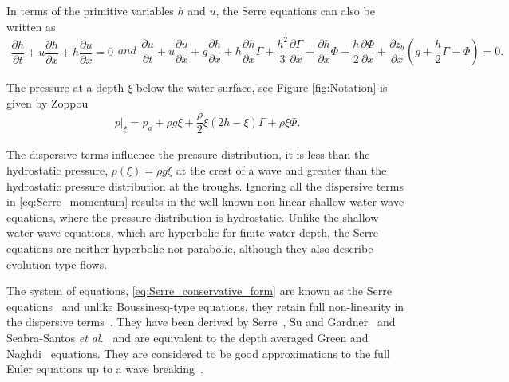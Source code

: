 \documentclass[preprint,sort&compress,1p]{article}
\begin{document}
In terms of the primitive variables $h$ and $u$, the Serre equations can also be written as
\begin{subequations}
\label{Serre_primary_variables}
\begin{gather}
\dfrac{\partial h}{\partial t} + u \dfrac{\partial h}{\partial x} + h \dfrac{\partial u}{\partial x} = 0
\end{gather}
and
\begin{gather}
\dfrac{\partial u}{\partial t} + u \dfrac{\partial u}{\partial x} + g \dfrac{\partial h}{\partial x} + h \dfrac{\partial h}{\partial x} \Gamma + \dfrac{h^2}{3} \dfrac{\partial \Gamma}{\partial x} + \dfrac{\partial h}{\partial x} \Phi + \dfrac{h}{2} \dfrac{\partial \Phi}{\partial x} + \dfrac{\partial z_b}{\partial x} \left ( g + \dfrac{h}{2} \Gamma + \Phi \right ) = 0 .
\label{Serre_primary_variables_momentum}
\end{gather}
\end{subequations}

The pressure at a depth $\xi$ below the water surface, see Figure \ref{fig:Notation} is given by Zoppou \cite{Zoppou-C-2014}
\begin{gather}\label{eq:pressure_serre}
p|_\xi = p_a + \rho g \xi + \dfrac{\rho}{2} \xi ( 2h - \xi ) \Gamma + \rho \xi \Phi.
\end{gather}

The dispersive terms influence the pressure distribution, it is less than the hydrostatic pressure,  $p(\xi) = \rho g \xi$ at the crest of a wave and greater than the hydrostatic pressure distribution at the troughs.  Ignoring all the dispersive terms in \eqref{eq:Serre_momentum} results in the well known non-linear shallow water wave equations, where the pressure distribution is hydrostatic. Unlike the shallow water wave equations, which are hyperbolic for finite water depth, the Serre equations are neither hyperbolic nor parabolic, although they also describe evolution-type flows.

The system of equations, \eqref{eq:Serre_conservative_form} are known as the Serre equations~\cite{Serre-F-1953-857,Seabra-Santos-etal-1987-117,Carter-Cienfuegos-2010-259} and unlike Boussinesq-type equations, they retain full non-linearity in the dispersive terms~\cite{El-etal-2006}. They have been derived by Serre~\cite{Serre-F-1953-857}, Su and Gardner~\cite{Su-Gardener-1969-536} and Seabra-Santos \emph{et al.}~\cite{Seabra-Santos-etal-1987-117} and are equivalent to the depth averaged Green and Naghdi~\cite{Green-Naghdi-1976-237} equations. They are considered to be good approximations to the full Euler equations up to a wave breaking~\cite{Bonneton-etal-2011-1479,Bonneton-etal-2011-589}.
\end{document}
